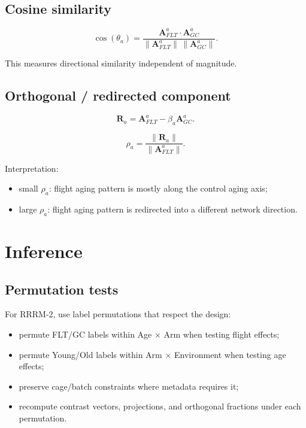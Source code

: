 \documentclass[11pt]{article}
\begin{document}
\subsection{Cosine similarity}

\[
\cos(\theta_a) =
\frac{\mathbf{A}^{a}_{FLT} \cdot \mathbf{A}^{a}_{GC}}
     {\|\mathbf{A}^{a}_{FLT}\| \, \|\mathbf{A}^{a}_{GC}\|}.
\]

This measures directional similarity independent of magnitude.

\subsection{Orthogonal / redirected component}

\[
\mathbf{R}_a =
\mathbf{A}^{a}_{FLT} - \beta_a \mathbf{A}^{a}_{GC}.
\]

\[
\rho_a =
\frac{\|\mathbf{R}_a\|}{\|\mathbf{A}^{a}_{FLT}\|}.
\]

Interpretation:

\begin{itemize}
  \item small $\rho_a$: flight aging pattern is mostly along the control aging
        axis;
  \item large $\rho_a$: flight aging pattern is redirected into a different
        network direction.
\end{itemize}

\section{Inference}

\subsection{Permutation tests}

For RRRM-2, use label permutations that respect the design:

\begin{itemize}
  \item permute FLT/GC labels within Age $\times$ Arm when testing flight
        effects;
  \item permute Young/Old labels within Arm $\times$ Environment when testing
        age effects;
  \item preserve cage/batch constraints where metadata requires it;
  \item recompute contrast vectors, projections, and orthogonal fractions under
        each permutation.
\end{itemize}
\end{document}
